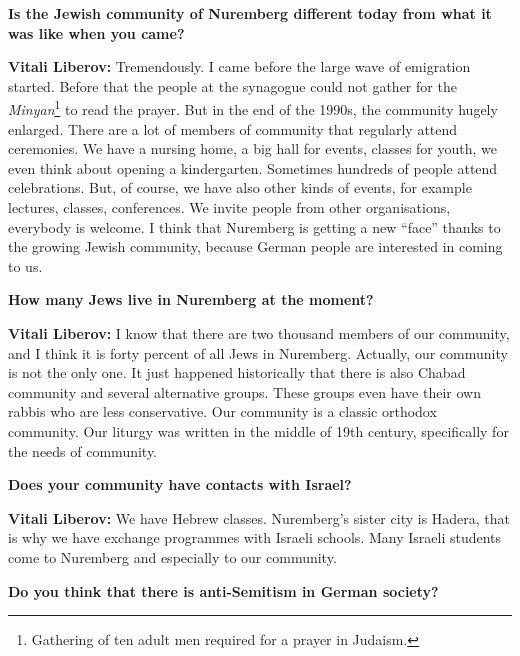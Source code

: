 \textbf{Is the Jewish community of Nuremberg different today from what it was like when you came?} 

\textbf{Vitali Liberov:} Tremendously. I came before the large wave of emigration started. Before that the people at the synagogue could not gather for the \textit{Minyan}\footnote{Gathering of ten adult men required for a prayer in Judaism.} to read the prayer. But in the end of the 1990s, the community hugely enlarged. There are a lot of members of community that regularly attend ceremonies. We have a nursing home, a big hall for events, classes for youth, we even think about opening a kindergarten. Sometimes hundreds of people attend celebrations.  But, of course, we have also other kinds of events, for example lectures, classes, conferences. We invite people from other organisations, everybody is welcome. I think that Nuremberg is getting a new ``face'' thanks to the growing Jewish community, because German people are interested in coming to us.    

\textbf{How many Jews live in Nuremberg at the moment?} 

\textbf{Vitali Liberov:} I know that there are two thousand members of our community, and I think it is forty percent of all Jews in Nuremberg. Actually, our community is not the only one. It just happened historically that there is also Chabad community and several alternative groups. These groups even have their own rabbis who are less conservative. Our community is a classic orthodox community. 
Our liturgy was written in the middle of 19th century, specifically for the needs of community.   

\textbf{Does your community have contacts with Israel?} 

\textbf{Vitali Liberov:} We have Hebrew classes. Nuremberg’s sister city is Hadera, that is why we have exchange programmes with Israeli schools. Many Israeli students come to Nuremberg and especially to our community. 

\textbf{Do you think that there is anti-Semitism in German society?} 

